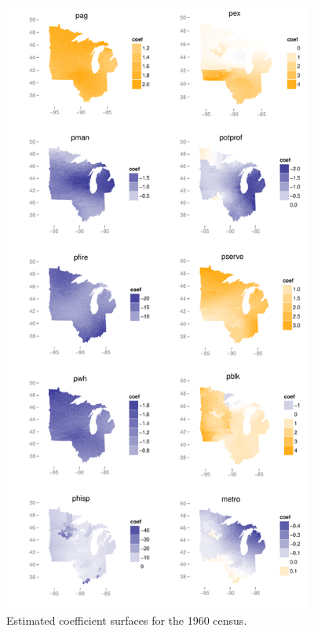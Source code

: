 	\begin{figure}
		\begin{center}
			\includegraphics[height=8in]{../../figures/poverty/1960.linear.coefficients.pdf}
			\caption{Estimated coefficient surfaces for the 1960 census.\label{fig:census-coefs-1960}}
		\end{center}		
	\end{figure}

